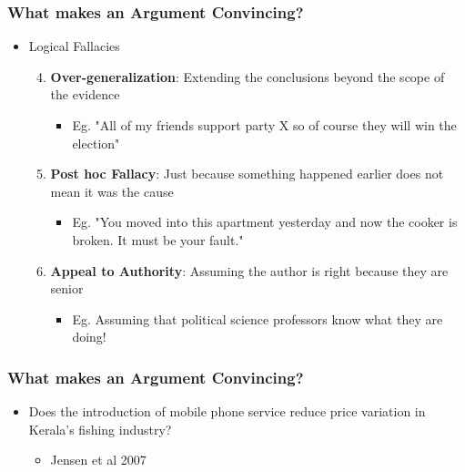 \documentclass[xcolor=x11names,compress]{beamer}\usepackage[]{graphicx}\usepackage[]{color}
\renewcommand{\(}{\begin{columns}}
\renewcommand{\)}{\end{columns}}
\newcommand{\<}[1]{\begin{column}{#1}}
\renewcommand{\>}{\end{column}}
\begin{document}
\begin{frame}
\begin{frame}
\begin{frame}
\frametitle{What makes an Argument Convincing?}
\begin{itemize}
\item Logical Fallacies
\begin{enumerate}
\setcounter{enumi}{3}
\item \textbf{Over-generalization}: Extending the conclusions beyond the scope of the evidence
\begin{itemize}
\item Eg. "All of my friends support party X so of course they will win the election"
\end{itemize}
\item \textbf{Post hoc Fallacy}: Just because something happened earlier does not mean it was the cause
\begin{itemize}
\item Eg. "You moved into this apartment yesterday and now the cooker is broken. It must be your fault."
\end{itemize}
\item \textbf{Appeal to Authority}: Assuming the author is right because they are senior
\begin{itemize}
\item Eg. Assuming that political science professors know what they are doing!
\end{itemize}
\end{enumerate}
\end{itemize}
\end{frame}

\begin{frame}
\frametitle{What makes an Argument Convincing?}
\begin{itemize}
\item Does the introduction of mobile phone service reduce price variation in Kerala's fishing industry?
\begin{itemize}
\item Jensen et al 2007
\end{itemize}
\end{itemize}
\end{frame}




\end{frame}
\end{frame}
\end{document}
